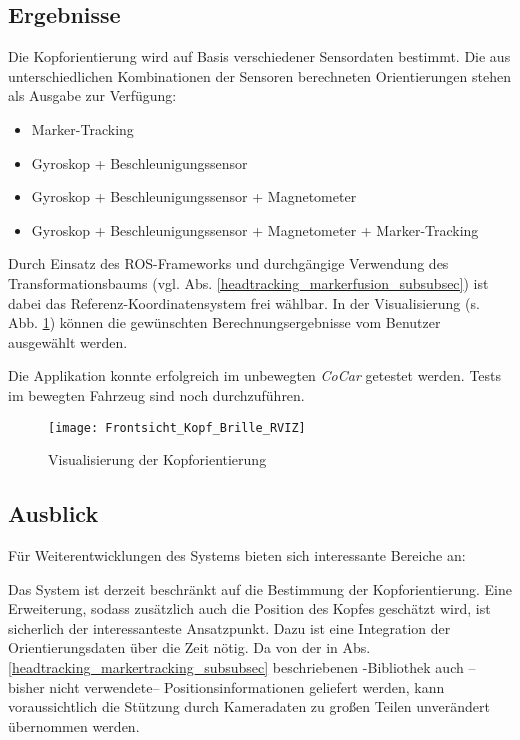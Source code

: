 
\subsection{Ergebnisse}

Die Kopforientierung wird auf Basis verschiedener Sensordaten bestimmt.
Die aus unterschiedlichen Kombinationen der Sensoren berechneten Orientierungen stehen als Ausgabe zur Verfügung:
\begin{itemize}
  \item Marker-Tracking
  \item Gyroskop + Beschleunigungssensor
  \item Gyroskop + Beschleunigungssensor + Magnetometer
  \item Gyroskop + Beschleunigungssensor + Magnetometer + Marker-Tracking
\end{itemize}

Durch Einsatz des \ac{ROS}-Frameworks und durchgängige Verwendung des Transformationsbaums (vgl. Abs. \ref{headtracking_markerfusion_subsubsec}) ist dabei das Referenz-Koordinatensystem frei wählbar.
In der Visualisierung (s. Abb. \ref{fig:kopf_orientierung_rviz}) können die gewünschten Berechnungsergebnisse vom Benutzer ausgewählt werden.


Die Applikation konnte erfolgreich im unbewegten \emph{CoCar} getestet werden.
Tests im bewegten Fahrzeug sind noch durchzuführen.


\begin{figure}
  \centering
  \texttt{[image: Frontsicht\_Kopf\_Brille\_RVIZ]}
  \caption{Visualisierung der Kopforientierung}
  \label{fig:kopf_orientierung_rviz}
\end{figure}


\subsection{Ausblick}


Für Weiterentwicklungen des Systems bieten sich interessante Bereiche an:

Das System ist derzeit beschränkt auf die Bestimmung der Kopforientierung.
Eine Erweiterung, sodass zusätzlich auch die Position des Kopfes geschätzt wird, ist sicherlich der interessanteste Ansatzpunkt.
Dazu ist eine Integration der Orientierungsdaten über die Zeit nötig.
Da von der in Abs. \ref{headtracking_markertracking_subsubsec} beschriebenen \alvar-Bibliothek auch --bisher nicht verwendete-- Positionsinformationen geliefert werden, kann voraussichtlich die Stützung durch Kameradaten zu großen Teilen unverändert übernommen werden.

